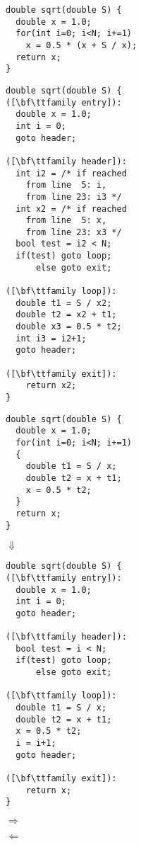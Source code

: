 \centering
\begin{minipage}{0.48\textwidth}
\centering
\begin{lstlisting}[language=MyCpp,captionpos=t,title=
   {{\bf(a)} {} C source function:\leftskip=0pt}]
double sqrt(double S) {
  double x = 1.0;
  for(int i=0; i<N; i+=1)
    x = 0.5 * (x + S / x);
  return x;
}
\end{lstlisting}
\phantom{\Huge$\Uparrow$}
\begin{lstlisting}[language=MyCpp,captionpos=t,title=
   {{\bf(d)} {} The SSA property is introduced:\leftskip=0pt}]
double sqrt(double S) {
([\bf\ttfamily entry]):
  double x = 1.0;
  int i = 0;
  goto header;

([\bf\ttfamily header]):
  int i2 = /* if reached
    from line  5: i,
    from line 23: i3 */
  int x2 = /* if reached
    from line  5: x,
    from line 23: x3 */
  bool test = i2 < N;
  if(test) goto loop;
      else goto exit;

([\bf\ttfamily loop]):
  double t1 = S / x2;
  double t2 = x2 + t1;
  double x3 = 0.5 * t2;
  int i3 = i2+1;
  goto header;

([\bf\ttfamily exit]):
    return x2;
}
\end{lstlisting}
\end{minipage}
\hfill
\begin{minipage}{0.48\textwidth}
\centering
{}
\begin{lstlisting}[language=MyCpp,title=
   {{\bf(b)} {} Complex expressions are broken down:\leftskip=0pt}]
double sqrt(double S) {
  double x = 1.0;
  for(int i=0; i<N; i+=1)
  {
    double t1 = S / x;
    double t2 = x + t1;
    x = 0.5 * t2;
  }
  return x;
}
\end{lstlisting}
{\Huge$\Downarrow$}
\begin{lstlisting}[language=MyCpp,title=
   {{\bf(c)} {} Structured control flow is expanded:\leftskip=0pt}]
double sqrt(double S) {
([\bf\ttfamily entry]):
  double x = 1.0;
  int i = 0;
  goto header;

([\bf\ttfamily header]):
  bool test = i < N;
  if(test) goto loop;
      else goto exit;

([\bf\ttfamily loop]):
  double t1 = S / x;
  double t2 = x + t1;
  x = 0.5 * t2;
  i = i+1;
  goto header;

([\bf\ttfamily exit]):
    return x;
}
\end{lstlisting}
\end{minipage}
\hspace{-\textwidth}
\begin{minipage}{\textwidth}
\centering
\Huge
\hfuzz=5cm

$\Rightarrow$

\vspace{9.5cm}

$\Leftarrow$\hspace{0.5cm}

\vspace{3.5cm}
\end{minipage}

